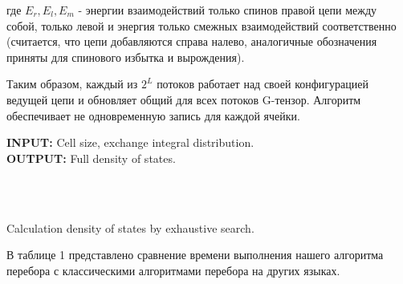 \documentclass[10pt]{article}
\begin{document}
	где $E_r, E_l, E_m$ - энергии взаимодействий только спинов правой цепи между собой, только левой и энергия только смежных взаимодействий соответственно (считается, что цепи добавляются справа налево, аналогичные обозначения приняты для спинового избытка и вырождения).
	
	Таким образом, каждый из $2^L$ потоков работает над своей конфигурацией ведущей цепи и обновляет общий для всех потоков G-тензор. Алгоритм обеспечивает не одновременную запись для каждой ячейки. 
	
	\begin{algorithm}[H]
		\textbf{INPUT:} Cell size, exchange integral distribution.\\
		\textbf{OUTPUT:} Full density of states.
		\begin{algorithmic}
			{
				{
					{
						\ENDFOR\\
					}
					\ENDFOR\\
				}
				\ENDFOR
			}
			\ENDFOR
		\end{algorithmic}
		\caption{Calculation density of states by exhaustive search.}
		\label{algo:dos_exhaustive}
	\end{algorithm}
	
	В таблице 1 представлено сравнение времени выполнения нашего алгоритма перебора с классическими алгоритмами перебора на других языках.
	
\end{document}

